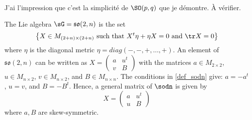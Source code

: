 \begin{probleme}
J'ai l'impression que c'est la simplicité de $\SO(p,q)$ que je démontre. À vérifier.
\end{probleme}

The Lie algebra $\sG=\mathfrak{so}(2,n)$ is the set 
\begin{equation}\label{def_sodn}
\big\{X\in M_{(2+n)\times (2+n)}\textrm{ such that }X^t\eta+\eta X=0\textrm{ and } \tr X=0\big\}
\end{equation}
where $\eta$ is the diagonal metric $\eta=diag(-,-,+,\ldots,+)$. An element of $\mathfrak{so}(2,n)$ can be written as
$
    X=\begin{pmatrix}
a & u ^t \\
v & B
\end{pmatrix}
$
with the matrices $a\in M_{2\times 2}$, $u\in M_{n\times 2}$, $v\in M_{n\times 2}$, and $B\in M_{n\times n}$. The conditions in \eqref{def_sodn} give: $a=-a^t$, $u=v$, and $B=-B^t$. Hence, a general matrix of $\sodn$ is given by
\begin{equation}	\label{eq:gene_sodn}
X=\begin{pmatrix}
a & u^t \\
u & B
\end{pmatrix}
\end{equation}
where $a,B$ are skew-symmetric.


